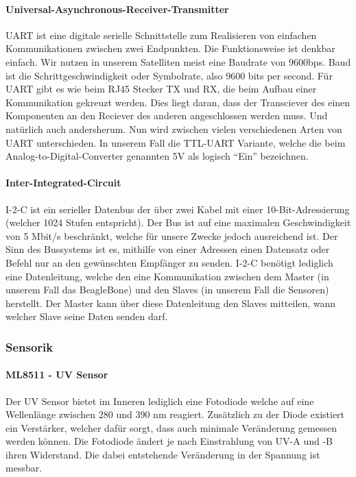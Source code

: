 \paragraph{Universal-Asynchronous-Receiver-Transmitter}
UART ist eine digitale serielle Schnittstelle zum Realisieren von einfachen Kommunikationen zwischen zwei Endpunkten. Die Funktionsweise ist denkbar einfach. Wir nutzen in unserem Satelliten meist eine Baudrate von 9600bps. Baud ist die Schrittgeschwindigkeit oder Symbolrate, also 9600 bits per second. Für UART gibt es wie beim RJ45 Stecker TX und RX, die beim Aufbau einer Kommunikation gekreuzt werden. Dies liegt daran, dass der Transciever des einen Komponenten an den Reciever des anderen angeschlossen werden muss. Und natürlich auch andersherum. Nun wird zwischen vielen verschiedenen Arten von UART unterschieden. In unserem Fall die TTL-UART Variante, welche die beim Analog-to-Digital-Converter genannten 5V als logisch ``Ein'' bezeichnen. \\

\paragraph{Inter-Integrated-Circuit}
I-2-C ist ein serieller Datenbus der über zwei Kabel mit einer 10-Bit-Adressierung (welcher 1024 Stufen entspricht). Der Bus ist auf eine maximalen Geschwindigkeit von 5 Mbit/s beschränkt, welche für unsere Zwecke jedoch ausreichend ist. Der Sinn des Bussystems ist es, mithilfe von einer Adressen einen Datensatz oder Befehl nur an den gewünschten Empfänger zu senden. I-2-C benötigt lediglich eine Datenleitung, welche den eine Kommunikation zwischen dem Master (in unserem Fall das BeagleBone) und den Slaves (in unserem Fall die Sensoren) herstellt. Der Master kann über diese Datenleitung den Slaves mitteilen, wann welcher Slave seine Daten senden darf.

\subsubsection{Sensorik}
\paragraph{ML8511 - UV Sensor}
Der UV Sensor bietet im Inneren lediglich eine Fotodiode welche auf eine Wellenlänge zwischen 280 und 390 nm reagiert. Zusätzlich zu der Diode existiert ein Verstärker, welcher dafür sorgt, dass auch minimale Veränderung gemessen werden können. Die Fotodiode ändert je nach Einstrahlung von UV-A und -B ihren Widerstand. Die dabei entstehende Veränderung in der Spannung ist messbar.

